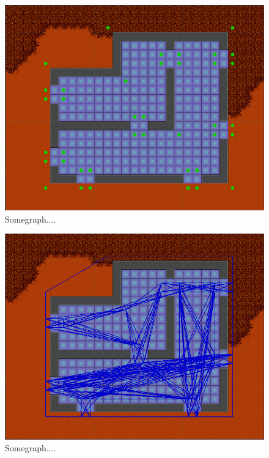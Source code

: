 \begin{figure}
	\includegraphics[width=\textwidth]{figures/astar/waypoints}
	\caption{Somegraph....}
	\label{waypointsNode}
\end{figure}

\begin{figure}
	\includegraphics[width=\textwidth]{figures/astar/waypointsGraph}
	\caption{Somegraph....}
	\label{waypointgraph}
\end{figure}
